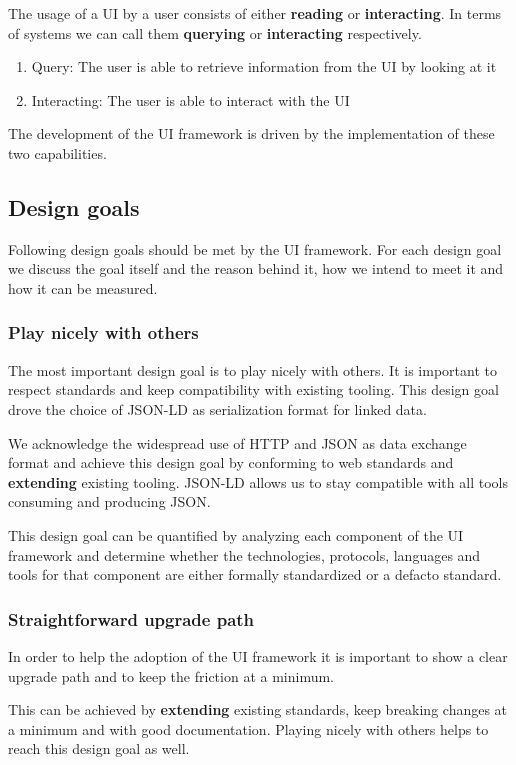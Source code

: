 The usage of a UI by a user consists of either \textbf{reading} or \textbf{interacting}. In terms of systems we can call them \textbf{querying} or \textbf{interacting} respectively.
\begin{enumerate}
  \item Query: The user is able to retrieve information from the UI by looking at it
  \item Interacting: The user is able to interact with the UI
\end{enumerate}

The development of the UI framework is driven by the implementation of these two capabilities.

\subsection{Design goals}
Following design goals should be met by the UI framework. For each design goal we discuss the goal itself and the reason behind it, how we intend to meet it and how it can be measured.

\subsubsection{Play nicely with others}\label{usecases}
The most important design goal is to play nicely with others. It is important to respect standards and keep compatibility with existing tooling. This design goal drove the choice of JSON-LD as serialization format for linked data.

We acknowledge the widespread use of HTTP and JSON as data exchange format and achieve this design goal by conforming to web standards and \textbf{extending} existing tooling. JSON-LD allows us to stay compatible with all tools consuming and producing JSON.

This design goal can be quantified by analyzing each component of the UI framework and determine whether the technologies, protocols, languages and tools for that component are either formally standardized or a defacto standard.

\subsubsection{Straightforward upgrade path}\label{usecases}
In order to help the adoption of the UI framework it is important to show a clear upgrade path and to keep the friction at a minimum.

This can be achieved by \textbf{extending} existing standards, keep breaking changes at a minimum and with good documentation. Playing nicely with others helps to reach this design goal as well.


